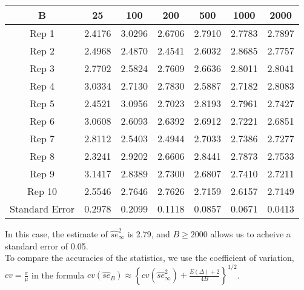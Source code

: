 \documentclass[10pt]{article}
\begin{document}
\begin{center}
\begin{tabular}{|c|cccccc|}
\hline
B & 25& 100 & 200&500 & 1000 & 2000 \\ \hline
Rep 1 &  2.4176  & 3.0296&   2.6706  & 2.7910 &  2.7783 &  2.7897 \\
Rep 2 & 2.4968   &2.4870   &2.4541   &2.6032  & 2.8685   &2.7757
 \\
Rep 3 &2.7702   &2.5824 &  2.7609  & 2.6636 &  2.8011  & 2.8041\\
Rep 4 &  3.0334   &2.7130 &  2.7830   &2.5887   &2.7182  & 2.8083\\
Rep 5 &2.4521 &  3.0956  & 2.7023  & 2.8193 &  2.7961  & 2.7427\\
Rep 6 & 3.0608   &2.6093  & 2.6392  & 2.6912 &  2.7221  & 2.6851\\
Rep 7 & 2.8112  & 2.5403  & 2.4944   &2.7033 &  2.7386  & 2.7277\\
Rep 8 & 2.3241   &2.9202 &  2.6606  & 2.8441  & 2.7873  & 2.7533\\
Rep 9 & 3.1417  & 2.8389  & 2.7300&  2.6807  & 2.7410  & 2.7211\\
Rep 10 & 2.5546 & 2.7646 & 2.7626 & 2.7159 & 2.6157&  2.7149\\ \hline
Standard Error &  0.2978 & 0.2099 & 0.1118 & 0.0857 &0.0671 &
  0.0413\\
\hline
\end{tabular}
\end{center}
In this case, the estimate of $\widehat{se}_{\infty}^2$ is 2.79, and $B \geq 2000$ allows us to acheive a standard error of 0.05. \\
To compare the accuracies of the statistics, we use the coefficient of variation, $cv=\frac{\sigma}{\mu}$ in the formula $cv(\widehat{se}_B)\approx
	\left\lbrace
		cv(\widehat{se}_{\infty}^2)+\frac{E(\Delta)+2}{4B}
	\right\rbrace^{1/2}$.
\end{document}
